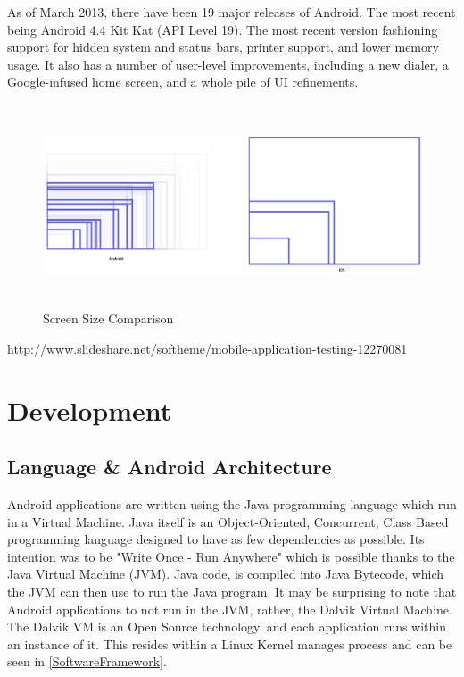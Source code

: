 \documentclass{l4proj}
\begin{document}
\begin{appendices}
As of March 2013, there have been 19 major releases of Android. The most recent being Android 4.4 Kit Kat (API Level 19).  The most recent version fashioning support for hidden system and status bars, printer support, and lower memory usage. It also has a number of user-level improvements, including a new dialer, a Google-infused home screen, and a whole pile of UI refinements.

\begin{figure}
\centering
\includegraphics[height=6cm,width=14cm]{sizeComp.png}
\vspace{0mm}
\caption{Screen Size Comparison}
\label{ScreenSize}
\end{figure}
http://www.slideshare.net/softheme/mobile-application-testing-12270081

\section{Development}

\subsection{Language \& Android Architecture}
Android applications are written using the Java programming language which run in a Virtual Machine.  Java itself is an Object-Oriented, Concurrent, Class Based programming language designed to have as few dependencies as possible. Its intention was to be "Write Once - Run Anywhere" which is possible thanks to the Java Virtual Machine (JVM).  Java code, is compiled into Java Bytecode, which the JVM can then use to run the Java program.  It may be surprising to note that Android applications to not run in the JVM, rather, the Dalvik Virtual Machine.  The Dalvik VM is an Open Source technology, and each application runs within an instance of it.  This resides within a Linux Kernel manages process and can be seen in \ref{SoftwareFramework}.


\end{appendices}
\end{document}
